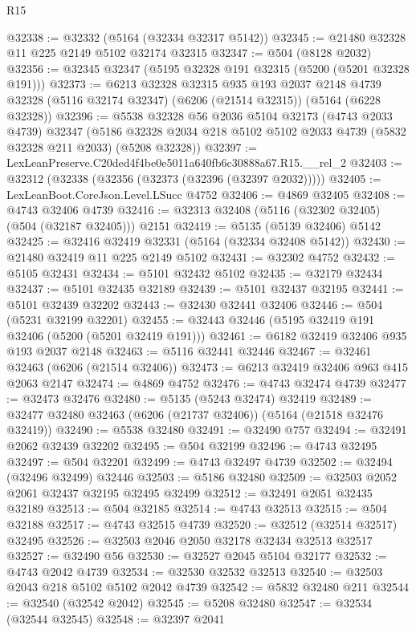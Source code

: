 \begin{lexlean}{R15}
\begin{coremodule}
{{{{{{{{{{{@32338 := @32332 (@5164 (@32334 @32317 @5142))
@32345 := @21480 @32328 @11 @225 @2149 @5102 @32174 @32315
@32347 := @504 (@8128 @2032)
@32356 := @32345 @32347 (@5195 @32328 @191 @32315 (@5200 (@5201 @32328 @191)))
@32373 := @6213
    @32328
    @32315
    @935
    @193
    @2037
    @2148
    @4739
    @32328
    (@5116 @32174 @32347)
    (@6206 (@21514 @32315))
    (@5164 (@6228 @32328))
@32396 := @5538
    @32328
    @56
    @2036
    @5104
    @32173
    (@4743 @2033 @4739)
    @32347
    (@5186 @32328 @2034 @218 @5102 @5102 @2033 @4739 (@5832 @32328 @211 @2033) (@5208 @32328))
@32397 := LexLeanPreserve.C20ded4f4be0e5011a640fb6c30888a67.R15.__rel_2
@32403 := @32312 (@32338 (@32356 (@32373 (@32396 (@32397 @2032)))))
@32405 := LexLeanBoot.CoreJson.Level.LSucc @4752
@32406 := @4869 @32405
@32408 := @4743 @32406 @4739
@32416 := @32313 @32408 (@5116 (@32302 @32405) (@504 (@32187 @32405))) @2151
@32419 := @5135 (@5139 @32406) @5142
@32425 := @32416 @32419 @32331 (@5164 (@32334 @32408 @5142))
@32430 := @21480 @32419 @11 @225 @2149 @5102
@32431 := @32302 @4752
@32432 := @5105 @32431
@32434 := @5101 @32432 @5102
@32435 := @32179 @32434
@32437 := @5101 @32435 @32189
@32439 := @5101 @32437 @32195
@32441 := @5101 @32439 @32202
@32443 := @32430 @32441 @32406
@32446 := @504 (@5231 @32199 @32201)
@32455 := @32443 @32446 (@5195 @32419 @191 @32406 (@5200 (@5201 @32419 @191)))
@32461 := @6182 @32419 @32406 @935 @193 @2037 @2148
@32463 := @5116 @32441 @32446
@32467 := @32461 @32463 (@6206 (@21514 @32406))
@32473 := @6213 @32419 @32406 @963 @415 @2063 @2147
@32474 := @4869 @4752
@32476 := @4743 @32474 @4739
@32477 := @32473 @32476
@32480 := @5135 (@5243 @32474) @32419
@32489 := @32477 @32480 @32463 (@6206 (@21737 @32406)) (@5164 (@21518 @32476 @32419))
@32490 := @5538 @32480
@32491 := @32490 @757
@32494 := @32491 @2062 @32439 @32202
@32495 := @504 @32199
@32496 := @4743 @32495
@32497 := @504 @32201
@32499 := @4743 @32497 @4739
@32502 := @32494 (@32496 @32499) @32446
@32503 := @5186 @32480
@32509 := @32503 @2052 @2061 @32437 @32195 @32495 @32499
@32512 := @32491 @2051 @32435 @32189
@32513 := @504 @32185
@32514 := @4743 @32513
@32515 := @504 @32188
@32517 := @4743 @32515 @4739
@32520 := @32512 (@32514 @32517) @32495
@32526 := @32503 @2046 @2050 @32178 @32434 @32513 @32517
@32527 := @32490 @56
@32530 := @32527 @2045 @5104 @32177
@32532 := @4743 @2042 @4739
@32534 := @32530 @32532 @32513
@32540 := @32503 @2043 @218 @5102 @5102 @2042 @4739
@32542 := @5832 @32480 @211
@32544 := @32540 (@32542 @2042)
@32545 := @5208 @32480
@32547 := @32534 (@32544 @32545)
@32548 := @32397 @2041
}}}}}}}}}}}
\end{coremodule}
\end{lexlean}
